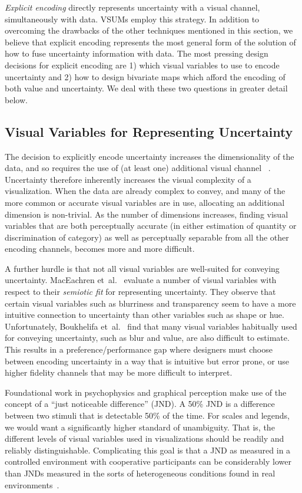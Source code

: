 \documentclass{vgtc}                          %
\newcommand{\ea}{{et~al.}\xspace}
\begin{document}
\emph{Explicit encoding} directly represents uncertainty with a visual channel, simultaneously with data. VSUMs employ this strategy. In addition to overcoming the drawbacks of the other techniques mentioned in this section, we believe that explicit encoding represents the most general form of the solution of how to fuse uncertainty information with data. The most pressing design decisions for explicit encoding are 1) which visual variables to use to encode uncertainty and 2) how to design bivariate maps which afford the encoding of both value and uncertainty. We deal with these two questions in greater detail below.

\subsection{Visual Variables for Representing Uncertainty}

The decision to explicitly encode uncertainty increases the dimensionality of the data, and so requires the use of (at least one) additional visual channel ~\cite{brodlie2012review}. Uncertainty therefore inherently increases the visual complexity of a visualization. When the data are already complex to convey, and many of the more common or accurate visual variables are in use, allocating an additional dimension is non-trivial. As the number of dimensions increases, finding visual variables that are both perceptually accurate (in either estimation of quantity or discrimination of category) as well as perceptually separable from all the other encoding channels, becomes more and more difficult.

A further hurdle is that not all visual variables are well-suited for conveying uncertainty. MacEachren \ea~\cite{maceachren2012visual} evaluate a number of visual variables with respect to their \emph{semiotic fit} for representing uncertainty. They observe that certain visual variables such as blurriness and transparency seem to have a more intuitive connection to uncertainty than other variables such as shape or hue. Unfortunately, Boukhelifa \ea~\cite{boukhelifa2012evaluating} find that many visual variables habitually used for conveying uncertainty, such as blur and value, are also difficult to estimate. This results in a preference/performance gap where designers must choose between encoding uncertainty in a way that is intuitive but error prone, or use higher fidelity channels that may be more difficult to interpret.

Foundational work in psychophysics and graphical perception make use of the concept of a ``just noticeable difference'' (JND)\cite{cleveland1984graphical}. A 50\% JND is a difference between two stimuli that is detectable 50\% of the time. For scales and legends, we would want a significantly higher standard of unambiguity. That is, the different levels of visual variables used in visualizations should be readily and reliably distinguishable. Complicating this goal is that a JND as measured in a controlled environment with cooperative participants can be considerably lower than JNDs measured in the sorts of heterogeneous conditions found in real environments~\cite{szafir2014adapting}.
\end{document}
